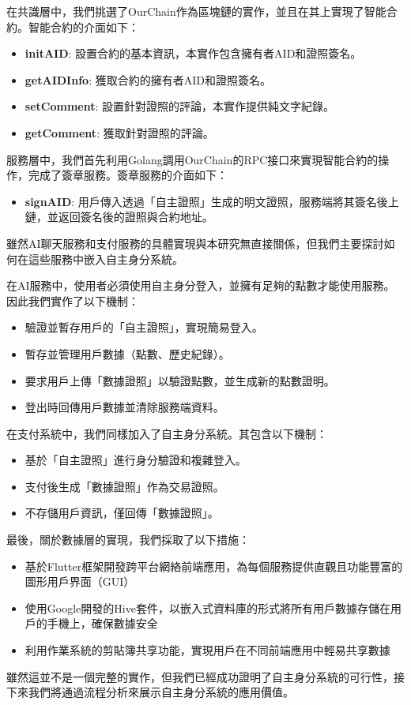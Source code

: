 在共識層中，我們挑選了OurChain\cite{ourlab408_ourchain}作為區塊鏈的實作，並且在其上實現了智能合約。智能合約的介面如下：
\begin{itemize}
  \item \textbf{initAID}: 設置合約的基本資訊，本實作包含擁有者AID和證照簽名。
  \item \textbf{getAIDInfo}: 獲取合約的擁有者AID和證照簽名。
  \item \textbf{setComment}: 設置針對證照的評論，本實作提供純文字紀錄。
  \item \textbf{getComment}: 獲取針對證照的評論。
\end{itemize}
服務層中，我們首先利用Golang調用OurChain的RPC接口來實現智能合約的操作，完成了簽章服務。簽章服務的介面如下：
\begin{itemize}
  \item \textbf{signAID}: 用戶傳入透過「自主證照」生成的明文證照，服務端將其簽名後上鏈，並返回簽名後的證照與合約地址。
\end{itemize}
雖然AI聊天服務和支付服務的具體實現與本研究無直接關係，但我們主要探討如何在這些服務中嵌入自主身分系統。

在AI服務中，使用者必須使用自主身分登入，並擁有足夠的點數才能使用服務。因此我們實作了以下機制：
\begin{itemize}
  \item 驗證並暫存用戶的「自主證照」，實現簡易登入。
  \item 暫存並管理用戶數據（點數、歷史紀錄）。
  \item 要求用戶上傳「數據證照」以驗證點數，並生成新的點數證明。
  \item 登出時回傳用戶數據並清除服務端資料。
\end{itemize}
在支付系統中，我們同樣加入了自主身分系統。其包含以下機制：
\begin{itemize}
  \item 基於「自主證照」進行身分驗證和複雜登入。
  \item 支付後生成「數據證照」作為交易證照。
  \item 不存儲用戶資訊，僅回傳「數據證照」。
\end{itemize}
最後，關於數據層的實現，我們採取了以下措施：
\begin{itemize}
  \item 基於Flutter框架開發跨平台網絡前端應用，為每個服務提供直觀且功能豐富的圖形用戶界面（GUI）
  \item 使用Google開發的Hive套件，以嵌入式資料庫的形式將所有用戶數據存儲在用戶的手機上，確保數據安全
  \item 利用作業系統的剪貼簿共享功能，實現用戶在不同前端應用中輕易共享數據
\end{itemize}
雖然這並不是一個完整的實作，但我們已經成功證明了自主身分系統的可行性，接下來我們將通過流程分析來展示自主身分系統的應用價值。
